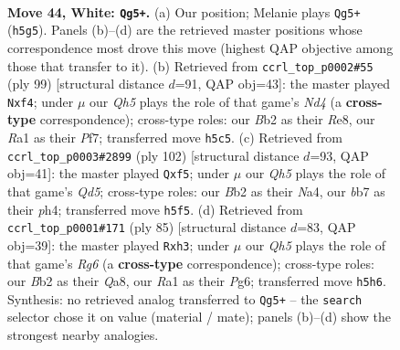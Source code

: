 \documentclass[11pt]{article}
\begin{document}
\clearpage

\begin{figure}[p]\centering
\begin{subfigure}{0.46\textwidth}\centering
\resizebox{\linewidth}{!}{%
\newchessgame
\chessboard[
  setfen={3q2k1/1b1n1p2/3P1n2/2p4Q/p6P/5pP1/PB6/R5K1 w - - 1 44},
  showmover=false,
  pgfstyle=straightmove, color=movearrow, markmove={h5-g5}
]}
\caption{}
\end{subfigure}\hfill
\begin{subfigure}{0.46\textwidth}\centering
\resizebox{\linewidth}{!}{%
\newchessgame
\chessboard[
  setfen={4r1k1/5p2/R2P2p1/2pn3p/1p2PP1q/1N1Q4/3N1P2/6K1 b - - 14 50},
  showmover=false,
  pgfstyle=straightmove, color=movearrow, markmove={d5-f4}
]}
\caption{}
\end{subfigure}
\\[4pt]
\begin{subfigure}{0.46\textwidth}\centering
\resizebox{\linewidth}{!}{%
\newchessgame
\chessboard[
  setfen={5r2/2q1k3/3p1nP1/3Q1p2/N1P1p2p/P7/1P5K/6R1 w - - 4 52},
  showmover=false,
  pgfstyle=straightmove, color=movearrow, markmove={d5-f5}
]}
\caption{}
\end{subfigure}\hfill
\begin{subfigure}{0.46\textwidth}\centering
\resizebox{\linewidth}{!}{%
\newchessgame
\chessboard[
  setfen={q2k4/8/6p1/4p3/1p1pNb1p/3P2rP/2QN4/4RK2 b - - 4 43},
  showmover=false,
  pgfstyle=straightmove, color=movearrow, markmove={g3-h3}
]}
\caption{}
\end{subfigure}
\caption{\textbf{Move 44, White: \texttt{Qg5+}.} (a) Our position; Melanie plays \texttt{Qg5+} (\texttt{h5g5}). Panels (b)--(d) are the retrieved master positions whose correspondence most drove this move (highest QAP objective among those that transfer to it). (b) Retrieved from \texttt{ccrl\_top\_p0002\#55} (ply 99) [structural distance $d$=91, QAP obj=43]: the master played \texttt{Nxf4}; under $\mu$ our \emph{Qh5} plays the role of that game's \emph{Nd4} (a \textbf{cross-type} correspondence); cross-type roles: our \emph{B}b2 as their \emph{R}e8, our \emph{R}a1 as their \emph{P}f7; transferred move \texttt{h5c5}. (c) Retrieved from \texttt{ccrl\_top\_p0003\#2899} (ply 102) [structural distance $d$=93, QAP obj=41]: the master played \texttt{Qxf5}; under $\mu$ our \emph{Qh5} plays the role of that game's \emph{Qd5}; cross-type roles: our \emph{B}b2 as their \emph{N}a4, our \emph{b}b7 as their \emph{p}h4; transferred move \texttt{h5f5}. (d) Retrieved from \texttt{ccrl\_top\_p0001\#171} (ply 85) [structural distance $d$=83, QAP obj=39]: the master played \texttt{Rxh3}; under $\mu$ our \emph{Qh5} plays the role of that game's \emph{Rg6} (a \textbf{cross-type} correspondence); cross-type roles: our \emph{B}b2 as their \emph{Q}a8, our \emph{R}a1 as their \emph{P}g6; transferred move \texttt{h5h6}. Synthesis: no retrieved analog transferred to \texttt{Qg5+} -- the \texttt{search} selector chose it on value (material / mate); panels (b)--(d) show the strongest nearby analogies.}
\label{fig:thought-m86}
\end{figure}
\end{document}
